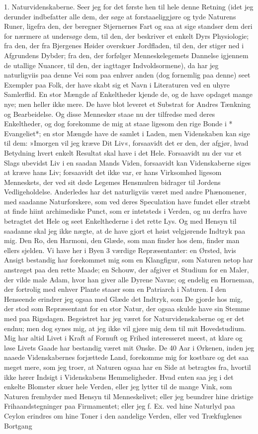 \documentclass[12pt,a4paper]{article}
\begin{document}
1. Naturvidenskaberne. Seer jeg for det første hen til hele denne Retning (idet jeg derunder indbefatter alle dem, der søge at forstaaeliggjøre og tyde Naturens Runer, ligefra den, der beregner Stjernernes Fart og saa at sige standser dem deri for nærmere at undersøge dem, til den, der beskriver et enkelt Dyrs Physiologie; fra den, der fra Bjergenes Høider overskuer Jordfladen, til den, der stiger ned i Afgrundens Dybder; fra den, der forfølger Menneskelegemets Dannelse igjennem de utallige Nuancer, til den, der iagttager Indvoldsormene), da har jeg naturligviis paa denne Vei som paa enhver anden (dog fornemlig paa denne) seet Exempler paa Folk, der have skabt sig et Navn i Literaturen ved en uhyre Samlerflid. En stor Mængde af Enkeltheder kjende de, og de have opdaget mange nye; men heller ikke mere. De have blot leveret et Substrat for Andres Tænkning og Bearbeidelse. Og disse Mennesker staae nu der tilfredse med deres Enkeltheder, og dog forekomme de mig at staae ligesom den rige Bonde i * Evangeliet*; en stor Mængde have de samlet i Laden, men Videnskaben kan sige til dem: »Imorgen vil jeg kræve Dit Liv«, forsaavidt det er den, der afgjør, hvad Betydning hvert enkelt Resultat skal have i det Hele. Forsaavidt nu der var et Slags ubevidst Liv i en saadan Mands Viden, forsaavidt kan Videnskaberne siges at kræve hans Liv; forsaavidt det ikke var, er hans Virksomhed ligesom Menneskets, der ved sit døde Legemes Hensmulren bidrager til Jordens Vedligeholdelse. Anderledes har det naturligviis været med andre Phænomener, med saadanne Naturforskere, som ved deres Speculation have fundet eller stræbt at finde hiint archimediske Punct, som er intetsteds i Verden, og nu derfra have betragtet det Hele og seet Enkelthederne i det rette Lys. Og med Hensyn til saadanne skal jeg ikke nægte, at de have gjort et høist velgjørende Indtryk paa mig. Den Ro, den Harmoni, den Glæde, som man finder hos dem, finder man ellers sjelden. Vi have her i Byen 3 værdige Repræsentanter: en Ørsted, hvis Ansigt bestandig har forekommet mig som en Klangfigur, som Naturen netop har anstrøget paa den rette Maade; en Schouw, der afgiver et Studium for en Maler, der vilde male Adam, hvor han giver alle Dyrene Navne; og endelig en Horneman, der fortrolig med enhver Plante staaer som en Patriarch i Naturen. I den Henseende erindrer jeg ogsaa med Glæde det Indtryk, som De gjorde hos mig, der stod som Repræsentant for en stor Natur, der ogsaa skulde have sin Stemme med paa Rigsdagen. Begeistret har jeg været for Naturvidenskaberne og er det endnu; men dog synes mig, at jeg ikke vil gjøre mig dem til mit Hovedstudium. Mig har altid Livet i Kraft af Fornuft og Frihed interesseret meest, at klare og løse Livets Gaade har bestandig været mit Ønske. De 40 Aar i Ørkenen, inden jeg naaede Videnskabernes forjættede Land, forekomme mig for kostbare og det saa meget mere, som jeg troer, at Naturen ogsaa har en Side at betragtes fra, hvortil ikke hører Indsigt i Videnskabens Hemmeligheder. Hvad enten saa jeg i det enkelte Blomster skuer hele Verden, eller jeg lytter til de mange Vink, som Naturen frembyder med Hensyn til Menneskelivet; eller jeg beundrer hine dristige Frihaandstegninger paa Firmamentet; eller jeg f. Ex. ved hine Naturlyd paa Ceylon erindres om hine Toner i den aandelige Verden, eller ved Trækfuglenes Bortgang 
\end{document}
